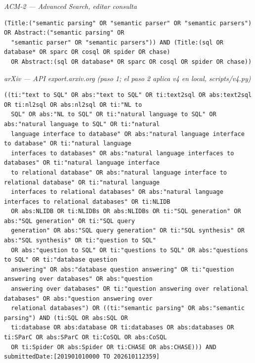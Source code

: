 \par\medskip\noindent\textit{ACM-2 — Advanced Search, editar consulta}\par\nopagebreak
\begin{lstlisting}
(Title:("semantic parsing" OR "semantic parser" OR "semantic parsers") OR Abstract:("semantic parsing" OR
  "semantic parser" OR "semantic parsers")) AND (Title:(sql OR database* OR sparc OR cosql OR spider OR chase)
  OR Abstract:(sql OR database* OR sparc OR cosql OR spider OR chase))
\end{lstlisting}

\par\medskip\noindent\textit{arXiv — API export.arxiv.org (paso 1; el paso 2 aplica v4 en local, scripts/v4.py)}\par\nopagebreak
\begin{lstlisting}
((ti:"text to SQL" OR abs:"text to SQL" OR ti:text2sql OR abs:text2sql OR ti:nl2sql OR abs:nl2sql OR ti:"NL to
  SQL" OR abs:"NL to SQL" OR ti:"natural language to SQL" OR abs:"natural language to SQL" OR ti:"natural
  language interface to database" OR abs:"natural language interface to database" OR ti:"natural language
  interfaces to databases" OR abs:"natural language interfaces to databases" OR ti:"natural language interface
  to relational database" OR abs:"natural language interface to relational database" OR ti:"natural language
  interfaces to relational databases" OR abs:"natural language interfaces to relational databases" OR ti:NLIDB
  OR abs:NLIDB OR ti:NLIDBs OR abs:NLIDBs OR ti:"SQL generation" OR abs:"SQL generation" OR ti:"SQL query
  generation" OR abs:"SQL query generation" OR ti:"SQL synthesis" OR abs:"SQL synthesis" OR ti:"question to SQL"
  OR abs:"question to SQL" OR ti:"questions to SQL" OR abs:"questions to SQL" OR ti:"database question
  answering" OR abs:"database question answering" OR ti:"question answering over databases" OR abs:"question
  answering over databases" OR ti:"question answering over relational databases" OR abs:"question answering over
  relational databases") OR ((ti:"semantic parsing" OR abs:"semantic parsing") AND (ti:SQL OR abs:SQL OR
  ti:database OR abs:database OR ti:databases OR abs:databases OR ti:SParC OR abs:SParC OR ti:CoSQL OR abs:CoSQL
  OR ti:Spider OR abs:Spider OR ti:CHASE OR abs:CHASE))) AND submittedDate:[201901010000 TO 202610112359]
\end{lstlisting}
